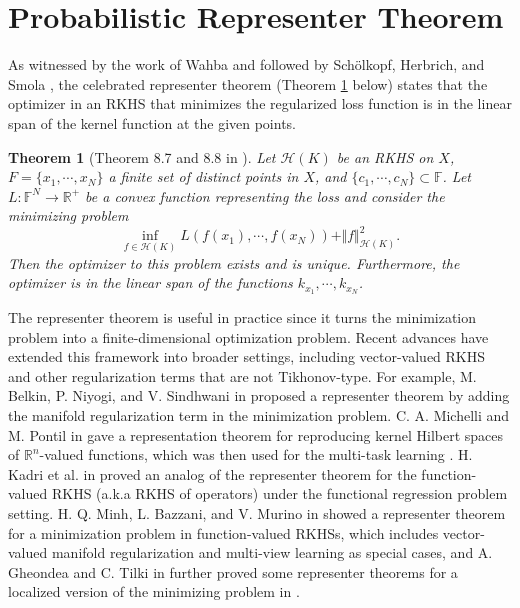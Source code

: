 \documentclass{amsart}
\numberwithin{equation}{section}
\theoremstyle{plain}
\newtheorem{theorem}[subsection]{Theorem}
\theoremstyle{remark}
\theoremstyle{definition}
\begin{document}



\section{Probabilistic Representer Theorem}\label{section4}

As witnessed by the work of Wahba \cite{wahba1990spline} and followed by Schölkopf, Herbrich, and Smola \cite{scholkopf2001generalized}, the celebrated representer theorem (Theorem \ref{Representer} below) states that the optimizer in an RKHS that minimizes the regularized loss function is in the linear span of the kernel function at the given points.
\begin{theorem}[Theorem 8.7 and 8.8 in \cite{paulsen2016introduction}]\label{Representer}
     Let $\mathscr{H}(K)$ be an RKHS on $X$,
    $F= \{x_1,\cdots, x_N\}$ a finite set of distinct points in $X$, and $\{c_1, \cdots, c_N\} \subset \mathbb{F}$. Let $L: \mathbb{F}^N \rightarrow \mathbb{R}^+$ be a convex function representing the loss and consider the minimizing problem 
    $$\underset{f \in \mathscr{H}(K)}{\inf} L(f(x_1), \cdots, f(x_N)) + \Vert f \Vert_{\mathscr{H}(K)}^2.$$
    Then the optimizer to this problem exists and is unique.
    Furthermore, the optimizer is in the linear span of the functions $k_{x_1}, \cdots, k_{x_N}$.
\end{theorem}

The representer theorem is useful in practice since it turns the minimization problem into a finite-dimensional optimization problem. Recent advances have extended this framework into broader settings, including vector-valued RKHS and other regularization terms that are not Tikhonov-type. For example, M. Belkin, P. Niyogi, and V. Sindhwani in \cite{belkin2006manifold} proposed a representer theorem by adding the manifold regularization term in the minimization problem. C. A. Michelli and M. Pontil
 in \cite{micchelli2005learning} gave a representation theorem for reproducing kernel Hilbert spaces of $\mathbb{R}^n$-valued functions, which was then used for the multi-task learning \cite{evgeniou2005learning}. 
H. Kadri et al. in \cite{kadri2016operator} proved an analog of the representer theorem for the function-valued RKHS (a.k.a RKHS of operators) under the functional regression problem setting. 
H. Q. Minh, L. Bazzani, and V. Murino in \cite{minh2016unifying} showed a representer theorem for a minimization problem in function-valued RKHSs, which
includes vector-valued manifold regularization and multi-view learning as special cases, and A. Gheondea and C. Tilki in \cite{gheondea2024localisation} further proved some representer theorems for a localized version of the minimizing problem in \cite{minh2016unifying}.
\end{document}
